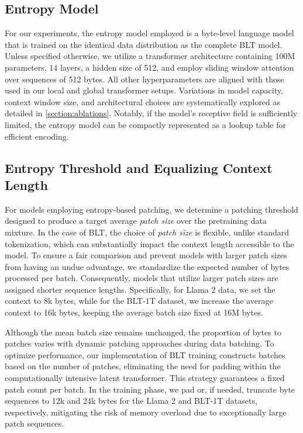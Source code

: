\subsection{Entropy Model} For our experiments, the entropy model employed is a byte-level language model that is trained on the identical data distribution as the complete {\textsc BLT} model. Unless specified otherwise, we utilize a transformer architecture containing 100M parameters, 14 layers, a hidden size of 512, and employ sliding window attention over sequences of 512 bytes. All other hyperparameters are aligned with those used in our local and global transformer setups. Variations in model capacity, context window size, and architectural choices are systematically explored as detailed in \autoref{section:ablations}. Notably, if the model's receptive field is sufficiently limited, the entropy model can be compactly represented as a lookup table for efficient encoding.

\subsection{Entropy Threshold and Equalizing Context Length} For models employing entropy-based patching, we determine a patching threshold designed to produce a target average \textit{patch size} over the pretraining data mixture. In the case of {\textsc BLT}, the choice of \textit{patch size} is flexible, unlike standard tokenization, which can substantially impact the context length accessible to the model. To ensure a fair comparison and prevent models with larger patch sizes from having an undue advantage, we standardize the expected number of bytes processed per batch. Consequently, models that utilize larger patch sizes are assigned shorter sequence lengths. Specifically, for Llama 2 data, we set the context to 8k bytes, while for the {\textsc BLT}-1T dataset, we increase the average context to 16k bytes, keeping the average batch size fixed at 16M bytes.

Although the mean batch size remains unchanged, the proportion of bytes to patches varies with dynamic patching approaches during data batching. To optimize performance, our implementation of {\textsc BLT} training constructs batches based on the number of patches, eliminating the need for padding within the computationally intensive latent transformer. This strategy guarantees a fixed patch count per batch. In the training phase, we pad or, if needed, truncate byte sequences to 12k and 24k bytes for the Llama 2 and {\textsc BLT}-1T datasets, respectively, mitigating the risk of memory overload due to exceptionally large patch sequences.

